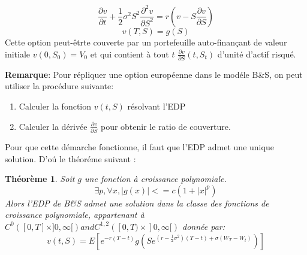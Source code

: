 \documentclass{article}
\theoremstyle{plain}
\newtheorem{thm}{Th\'eor\`eme}[section]
\theoremstyle{definition}
\begin{document}
\begin{equation}
\frac{\partial v}{\partial t}+\frac{1}{2} \sigma^2 S^2 \frac{\partial^2 v}{\partial S^2}=r(v-S\frac{\partial v}{\partial S})
\end{equation}
\begin{equation}
v(T,S) = g(S)
\end{equation}
Cette option peut-\^etrte couverte par un portefeuille auto-finan\c{c}ant de valeur initiale $v(0,S_0)=V_0$ et qui contient \`a tout $t$ $\frac{\partial v}{\partial S}(t,S_t)$ d'unit\'e d'actif risqu\'e.

\textbf{Remarque}: Pour r\'epliquer une option europ\'eenne dans le mod\'ele B\&S, on peut utiliser la proc\'edure suivante:
\begin{enumerate}
\item Calculer la fonction $v(t,S)$ r\'esolvant l'EDP

\item Calculer la d\'eriv\'ee $\frac{\partial v}{\partial S}$ pour obtenir le ratio de couverture.
\end{enumerate}

Pour que cette d\'emarche fonctionne, il faut que l'EDP admet une unique solution. D'o\'u le th\'eor\'eme suivant :

\begin{thm}
	Soit $g$ une fonction \`a croissance polynomiale.
\begin{equation}
\exists p, \forall x, |g(x)|<=c(1+|x|^p)
\end{equation}
Alors l'EDP de B\&S admet une solution dans la classe des fonctions de croissance polynomiale, appartenant \`a $C^0([0,T]\times ]0,\infty[) and C^{1,2}([0,T)\times]0,\infty[)$ donn\'ee par:
\begin{equation}
v(t,S)=E[e^{-r(T-t)}g(Se^{(r-\frac{1}{2}\sigma^2)(T-t)+\sigma (W_T -W_t)})]
\end{equation}
\end{thm}
\end{document}
